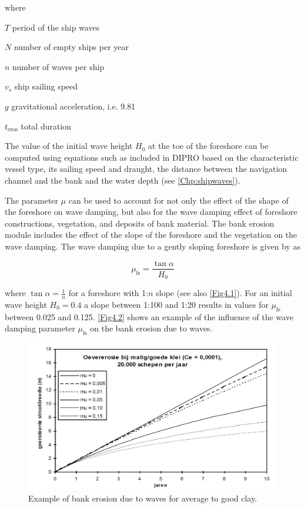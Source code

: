 where

\begin{symbollist}
\item[$T$] period of the ship waves 
\item[$N$] number of empty ships per year \unitbrackets{-}
\item[$n$] number of waves per ship \unitbrackets{-}
\item[$v_s$] ship sailing speed 
\item[$g$] gravitational acceleration, i.e. 9.81 
\item[$t_\text{eros}$] total duration 
\end{symbollist}

The value of the initial wave height $H_0$ at the toe of the foreshore can be computed using equations such as included in DIPRO based on the characteristic vessel type, its sailing speed and draught, the distance between the navigation channel and the bank and the water depth (see \autoref{Chp:shipwaves}).

The parameter $\mu$ can be used to account for not only the effect of the shape of the foreshore on wave damping, but also for the wave damping effect of foreshore constructions, vegetation, and deposits of bank material.
The bank erosion module includes the effect of the slope of the foreshore and the vegetation on the wave damping.
The wave damping due to a gently sloping foreshore is given by \citet{Verheij00} as

\begin{equation}
\mu_\text{fs} = \frac{\tan \alpha}{H_0}
\end{equation}

where $\tan \alpha = \frac{1}{n}$ for a foreshore with 1:$n$ slope (see also \autoref{Fig4.1}).
For an initial wave height $H_0 = 0.4$ a slope between 1:100 and 1:20 results in values for $\mu_\text{fs}$ between 0.025 and 0.125.
\autoref{Fig4.2} shows an example of the influence of the wave damping parameter $\mu_\text{fs}$ on the bank erosion due to waves.

\begin{figure}
\includegraphics[width=\textwidth]{figures/Fig4-2.png}
\caption{Example of bank erosion due to waves for average to good clay.}
\label{Fig4.2}
\end{figure}

